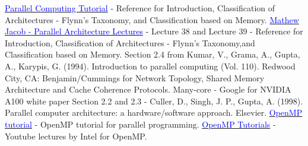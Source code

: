 \documentclass[12pt]{article}
\newcommand{\weblink}[2]{\href{#1}{\textcolor{blue}{#2}}}
\begin{document}
\begin{thebibliography}{9}
    \weblink{http://www.llnl.gov/computing/tutorials/parallel_comp/}{Parallel Computing Tutorial} - Reference for Introduction, Classification of Architectures - Flynn's Taxonomy, and Classification based on Memory.
    \weblink{https://youtu.be/-yMWgtTeQgY?si=_PIhzFH7zZTydzcM}{Mathew Jacob - Parallel Architecture Lectures} - Lecture 38 and Lecture 39 - Reference for Introduction, Classification of Architectures - Flynn's Taxonomy,and Classification based on Memory.
    Section 2.4 from Kumar, V., Grama, A., Gupta, A., Karypis, G. (1994). Introduction to parallel computing (Vol. 110). Redwood City, CA: Benjamin/Cummings for Network Topology, Shared Memory Architecture and Cache Coherence Protocols.
    Many-core - Google for NVIDIA A100 white paper
    Section 2.2 and 2.3 - Culler, D., Singh, J. P., Gupta, A. (1998). Parallel computer architecture: a hardware/software approach. Elsevier.
    \weblink{https://hpc-tutorials.llnl.gov/openmp/}{OpenMP tutorial} - OpenMP tutorial for parallel programming.
    \weblink{https://www.youtube.com/watch?v=nE-xN4Bf8XI&list=PLLX-Q6B8xqZ8n8bwjGdzBJ25X2utwnoEG}{OpenMP Tutorials} - Youtube lectures by Intel for OpenMP.

\end{thebibliography}
\end{document}
